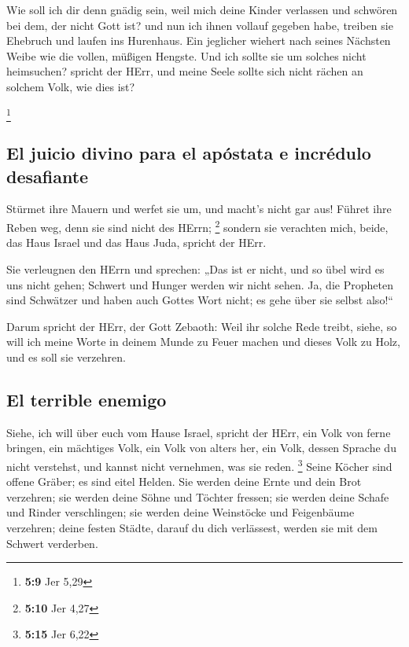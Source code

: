  Wie soll ich dir denn gnädig sein, weil mich deine Kinder
verlassen und schwören bei dem, der nicht Gott ist? und nun ich ihnen
vollauf gegeben habe, treiben sie Ehebruch und laufen ins Hurenhaus.
 Ein jeglicher wiehert nach seines Nächsten Weibe wie die
vollen, müßigen Hengste.  Und ich sollte sie um solches
nicht heimsuchen? spricht der HErr, und meine Seele sollte sich nicht
rächen an solchem Volk, wie dies ist?

\footnote{\textbf{5:9} Jer 5,29}

\hypertarget{el-juicio-divino-para-el-apuxf3stata-e-incruxe9dulo-desafiante}{%
\subsection{El juicio divino para el apóstata e incrédulo
desafiante}\label{el-juicio-divino-para-el-apuxf3stata-e-incruxe9dulo-desafiante}}

 Stürmet ihre Mauern und werfet sie um, und macht's nicht
gar aus! Führet ihre Reben weg, denn sie sind nicht des HErrn;
\footnote{\textbf{5:10} Jer 4,27}  sondern sie verachten
mich, beide, das Haus Israel und das Haus Juda, spricht der HErr.

 Sie verleugnen den HErrn und sprechen: „Das ist er
nicht, und so übel wird es uns nicht gehen; Schwert und Hunger werden
wir nicht sehen.  Ja, die Propheten sind Schwätzer und
haben auch Gottes Wort nicht; es gehe über sie selbst also!{}``

 Darum spricht der HErr, der Gott Zebaoth: Weil ihr
solche Rede treibt, siehe, so will ich meine Worte in deinem Munde zu
Feuer machen und dieses Volk zu Holz, und es soll sie verzehren.

\hypertarget{el-terrible-enemigo}{%
\subsection{El terrible enemigo}\label{el-terrible-enemigo}}

 Siehe, ich will über euch vom Hause Israel, spricht der
HErr, ein Volk von ferne bringen, ein mächtiges Volk, ein Volk von
alters her, ein Volk, dessen Sprache du nicht verstehst, und kannst
nicht vernehmen, was sie reden. \footnote{\textbf{5:15} Jer 6,22}
 Seine Köcher sind offene Gräber; es sind eitel Helden.
 Sie werden deine Ernte und dein Brot verzehren; sie
werden deine Söhne und Töchter fressen; sie werden deine Schafe und
Rinder verschlingen; sie werden deine Weinstöcke und Feigenbäume
verzehren; deine festen Städte, darauf du dich verlässest, werden sie
mit dem Schwert verderben.

